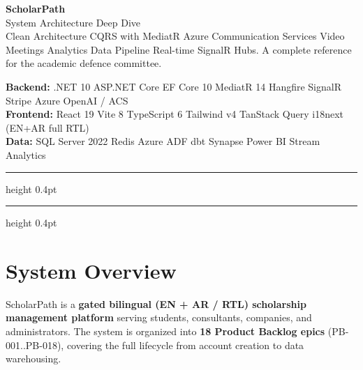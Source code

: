 \documentclass[11pt,a4paper]{article}
\begin{document}

\begin{tcolorbox}[colback=spPrimary,colframe=spPrimary,arc=4pt,boxrule=0pt]
  \color{white}
  {\Huge\bfseries ScholarPath}\\[3pt]
  {\LARGE System Architecture Deep Dive}\\[8pt]
  {\normalsize Clean Architecture \textperiodcentered{} CQRS with MediatR
  \textperiodcentered{} Azure Communication Services Video Meetings
  \textperiodcentered{} Analytics Data Pipeline
  \textperiodcentered{} Real-time SignalR Hubs.
  A complete reference for the academic defence committee.}
\end{tcolorbox}

\vspace{4pt}
{\small\color{spInk}
\textbf{Backend:} .NET 10 \textperiodcentered{} ASP.NET Core \textperiodcentered{}
EF Core 10 \textperiodcentered{} MediatR 14 \textperiodcentered{} Hangfire
\textperiodcentered{} SignalR \textperiodcentered{} Stripe \textperiodcentered{}
Azure OpenAI / ACS\\
\textbf{Frontend:} React 19 \textperiodcentered{} Vite 8 \textperiodcentered{}
TypeScript 6 \textperiodcentered{} Tailwind v4 \textperiodcentered{} TanStack Query
\textperiodcentered{} i18next (EN+AR full RTL)\\
\textbf{Data:} SQL Server 2022 \textperiodcentered{} Redis
\textperiodcentered{} Azure ADF \textperiodcentered{} dbt
\textperiodcentered{} Synapse \textperiodcentered{} Power BI
\textperiodcentered{} Stream Analytics
}

\vspace{2pt}\hrule height 0.4pt\vspace{6pt}
{\small\tableofcontents}
\vspace{4pt}\hrule height 0.4pt

\newpage

\section{System Overview}

ScholarPath is a \textbf{gated bilingual (EN + AR / RTL) scholarship management
platform} serving students, consultants, companies, and administrators.
The system is organized into \textbf{18 Product Backlog epics} (PB-001..PB-018),
covering the full lifecycle from account creation to data warehousing.
\end{document}
